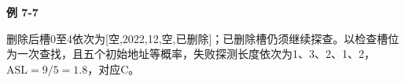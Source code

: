 {\color{ink}\bfseries 例 7-7}\par\vspace{1bp}删除后槽0至4依次为[空,\allowbreak{}2022,\allowbreak{}12,\allowbreak{}空,\allowbreak{}已删除]；已删除槽仍须继续探查。以检查槽位为一次查找，且五个初始地址等概率，失败探测长度依次为1、3、2、1、2，\(\mathrm{ASL}=\allowbreak{}9/\allowbreak{}5=\allowbreak{}1.8\)，对应C。
